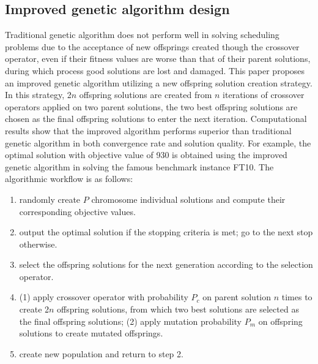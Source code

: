 \subsection{Improved genetic algorithm design}
Traditional genetic algorithm does not perform well in solving scheduling problems due to the acceptance of new offsprings created though the crossover operator, even if their fitness values are worse than that of their parent solutions, during which process good solutions are lost and damaged.
This paper proposes an improved genetic algorithm utilizing a new offspring solution creation strategy.
In this strategy, 2$n$ offspring solutions are created from $n$ iterations of crossover operators applied on two parent solutions, the two best offspring solutions are chosen as the final offspring solutions to enter the next iteration.
Computational results show that the improved algorithm performs superior than traditional genetic algorithm in both convergence rate and solution quality.
For example, the optimal solution with objective value of 930 is obtained using the improved genetic algorithm in solving the famous benchmark instance FT10.
The algorithmic workflow is as follows:
\begin{enumerate}
	\item randomly create $P$ chromosome individual solutions and compute their corresponding objective values.
	\item output the optimal solution if the stopping criteria is met; go to the next stop otherwise.
	\item select the offspring solutions for the next generation according to the selection operator.
	\item (1) apply crossover operator with probability $P_c$ on parent solution $n$ times to create 2$n$ offspring solutions, from which two best solutions are selected as the final offspring solutions; (2) apply mutation probability $P_m$ on offspring solutions to create mutated offsprings.
	\item create new population and return to step 2.
\end{enumerate}
